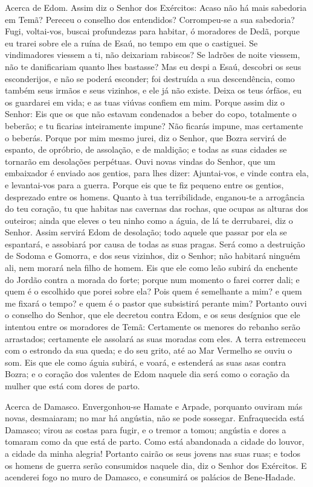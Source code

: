 Acerca de Edom. Assim diz o Senhor dos Exércitos: Acaso não há
mais sabedoria em Temã? Pereceu o conselho dos entendidos?
Corrompeu-se a sua sabedoria? Fugi, voltai-vos, buscai
profundezas para habitar, ó moradores de Dedã, porque eu trarei
sobre ele a ruína de Esaú, no tempo em que o castiguei. Se
vindimadores viessem a ti, não deixariam rabiscos? Se ladrões de
noite viessem, não te danificariam quanto lhes bastasse? Mas
eu despi a Esaú, descobri os seus esconderijos, e não se poderá
esconder; foi destruída a sua descendência, como também seus irmãos
e seus vizinhos, e ele já não existe. Deixa os teus órfãos,
eu os guardarei em vida; e as tuas viúvas confiem em mim.
Porque assim diz o Senhor: Eis que os que não estavam
condenados a beber do copo, totalmente o beberão; e tu ficarias
inteiramente impune? Não ficarás impune, mas certamente o beberás.
Porque por mim mesmo jurei, diz o Senhor, que Bozra servirá
de espanto, de opróbrio, de assolação, e de maldição; e todas as
suas cidades se tornarão em desolações perpétuas. Ouvi novas
vindas do Senhor, que um embaixador é enviado aos gentios, para lhes
dizer: Ajuntai-vos, e vinde contra ela, e levantai-vos para a
guerra. Porque eis que te fiz pequeno entre os gentios,
desprezado entre os homens. Quanto à tua terribilidade,
enganou-te a arrogância do teu coração, tu que habitas nas cavernas
das rochas, que ocupas as alturas dos outeiros; ainda que eleves o
teu ninho como a águia, de lá te derrubarei, diz o Senhor.
Assim servirá Edom de desolação; todo aquele que passar por
ela se espantará, e assobiará por causa de todas as suas pragas.
Será como a destruição de Sodoma e Gomorra, e dos seus
vizinhos, diz o Senhor; não habitará ninguém ali, nem morará nela
filho de homem. Eis que ele como leão subirá da enchente do
Jordão contra a morada do forte; porque num momento o farei correr
dali; e quem é o escolhido que porei sobre ela? Pois quem é
semelhante a mim? e quem me fixará o tempo? e quem é o pastor que
subsistirá perante mim? Portanto ouvi o conselho do Senhor,
que ele decretou contra Edom, e os seus desígnios que ele intentou
entre os moradores de Temã: Certamente os menores do rebanho serão
arrastados; certamente ele assolará as suas moradas com eles.
A terra estremeceu com o estrondo da sua queda; e do seu
grito, até ao Mar Vermelho se ouviu o som. Eis que ele como
águia subirá, e voará, e estenderá as suas asas contra Bozra; e o
coração dos valentes de Edom naquele dia será como o coração da
mulher que está com dores de parto.

Acerca de Damasco. Envergonhou-se Hamate e Arpade, porquanto
ouviram más novas, desmaiaram; no mar há angústia, não se pode
sossegar. Enfraquecida está Damasco; virou as costas para
fugir, e o tremor a tomou; angústia e dores a tomaram como da que
está de parto. Como está abandonada a cidade do louvor, a
cidade da minha alegria! Portanto cairão os seus jovens nas
suas ruas; e todos os homens de guerra serão consumidos naquele dia,
diz o Senhor dos Exércitos. E acenderei fogo no muro de
Damasco, e consumirá os palácios de Bene-Hadade.

